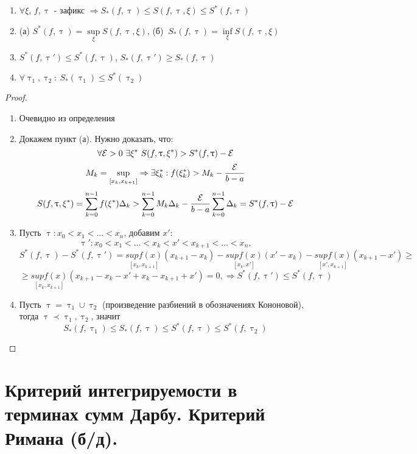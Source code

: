 \documentclass[11pt, fleqn]{article}
\begin{document}
\begin{properties}
    \begin{enumerate}
        \item $\forall \xi$, $f, \uptau$ - зафикс $\Rightarrow S_*(f,\uptau) \leqslant S(f, \uptau, \xi) \leqslant S^*(f, \uptau)$
        \item (а) $S^*(f, \uptau) = \sup\limits_\xi S(f, \uptau, \xi)$, (б) $\ S_*(f, \uptau) = \inf\limits_\xi S(f, \uptau, \xi)$
        \item $S^*(f, \uptau') \leqslant S^*(f, \uptau)$, $S_*(f, \uptau') \geqslant S_*(f, \uptau)$
        \item $\forall \uptau_1, \uptau_2:\ S_*(\uptau_1) \leqslant S^*(\uptau_2)$
    \end{enumerate}
\end{properties}

\begin{proof}
    \begin{enumerate}
        \item Очевидно из определения
        \item Докажем пункт (а). Нужно доказать, что:
        $$\forall \mathcal{E} > 0\ \exists \xi^* \ S(f, \uptau, \xi^*) > S^* (f, \uptau) - \mathcal{E}$$
        $$M_k=\sup\limits_{[x_k,x_{k+1}]} \Rightarrow \exists \xi_k^*: f(\xi_k^*) > M_k - \frac{\mathcal{E}}{b-a}$$
        $$S(f, \uptau, \xi^*)=\sum\limits_{k=0}^{n-1} f(\xi^*) \Delta_k > \sum\limits_{k=0}^{n-1} M_k \Delta_k - \frac{\mathcal{E}}{b-a} \sum\limits_{k=0}^{n-1} \Delta_k = S^*(f, \uptau)-\mathcal{E}$$
        \item Пусть $\uptau: x_0<x_1<...<x_n$, добавим $x'$: 
        $$\uptau': x_0<x_1<...<x_k<x'<x_{k+1}<...<x_n,$$
        $$S^*(f,\uptau)-S^*(f,\uptau')=\underset{[x_k,x_{k+1}]}{sup f(x)}(x_{k+1}-x_k) - \underset{[x_k,x']}{sup f(x)}(x'-x_k) - \underset{[x',x_{k+1}]}{sup f(x)} (x_{k+1}-x') \geqslant$$ $$\geqslant \underset{[x_k,x_{k+1}]}{sup f(x)} (x_{k+1}-x_k-x'+x_k-x_{k+1}+x') = 0, \Rightarrow S^*(f, \uptau') \leqslant S^*(f, \uptau)$$
        \item Пусть $\uptau = \uptau_1 \cup \uptau_2$ (произведение разбиений в обозначениях Кононовой), тогда $\uptau \prec \uptau_1, \uptau_2$, значит 
        $$S_*(f, \uptau_1) \leqslant S_*(f, \uptau) \leqslant S^*(f, \uptau) \leqslant S^*(f, \uptau_2)$$
    \end{enumerate}
\end{proof}

\newpage
\section{Критерий интегрируемости в терминах сумм Дарбу. Критерий Римана (б/д).}
 
\end{document}
